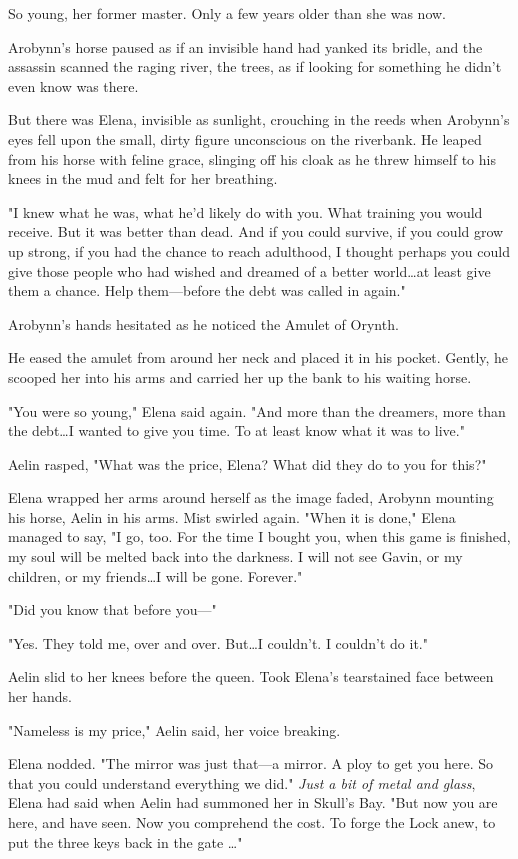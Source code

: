 So young, her former master.
Only a few years older than she was now.

Arobynn's horse paused as if an invisible hand had yanked its bridle, and the assassin scanned the raging river, the trees, as if looking for something he didn't even know was there.

But there was Elena, invisible as sunlight, crouching in the reeds when Arobynn's eyes fell upon the small, dirty figure unconscious on the riverbank.
He leaped from his horse with feline grace, slinging off his cloak as he threw himself to his knees in the mud and felt for her breathing.

"I knew what he was, what he'd likely do with you.
What training you would receive.
But it was better than dead.
And if you could survive, if you could grow up strong, if you had the chance to reach adulthood, I thought perhaps you could give those people who had wished and dreamed of a better world\ldots at least give them a chance.
Help them---before the debt was called in again."

Arobynn's hands hesitated as he noticed the Amulet of Orynth.

He eased the amulet from around her neck and placed it in his pocket.
Gently, he scooped her into his arms and carried her up the bank to his waiting horse.

"You were so young," Elena said again.
"And more than the dreamers, more than the debt\ldots I wanted to give you time.
To at least know what it was to live."

Aelin rasped, "What was the price, Elena?
What did they do to you for this?"

Elena wrapped her arms around herself as the image faded, Arobynn mounting his horse, Aelin in his arms.
Mist swirled again.
"When it is done," Elena managed to say, "I go, too.
For the time I bought you, when this game is finished, my soul will be melted back into the darkness.
I will not see Gavin, or my children, or my friends\ldots I will be gone.
Forever."

"Did you know that before you---"

"Yes.
They told me, over and over.
But\ldots I couldn't.
I couldn't do it."

Aelin slid to her knees before the queen.
Took Elena's tearstained face between her hands.

"Nameless is my price," Aelin said, her voice breaking.

Elena nodded.
"The mirror was just that---a mirror.
A ploy to get you here.
So that you could understand everything we did."
\emph{Just a bit of metal and glass}, Elena had said when Aelin had summoned her in Skull's Bay.
"But now you are here, and have seen.
Now you comprehend the cost.
To forge the Lock anew, to put the three keys back in the gate \ldots"


